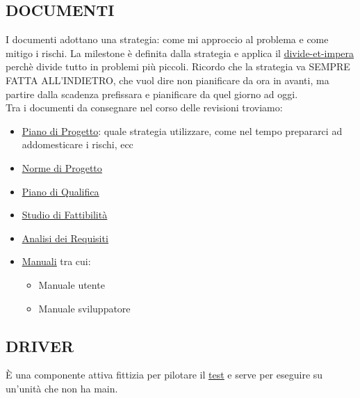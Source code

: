 		\subsection{DOCUMENTI}		\label{documenti}
		I documenti adottano una strategia: come mi approccio al problema e come mitigo i rischi. La milestone è definita dalla strategia e applica il \underline{\hyperref[divideetimpera]{divide-et-impera}} perchè divide tutto in problemi più piccoli. Ricordo che la strategia va SEMPRE FATTA ALL'INDIETRO, che vuol dire non pianificare da ora in avanti, ma partire dalla scadenza prefissara e pianificare da quel giorno ad oggi. \\
		Tra i documenti da consegnare nel corso delle revisioni troviamo:
		\begin{itemize}
			\item \underline{\hyperref[piano]{Piano di Progetto}}: quale strategia utilizzare, come nel tempo prepararci ad addomesticare i rischi, ecc
			\item \underline{\hyperref[norme]{Norme di Progetto}}
			\item \underline{\hyperref[pianoqualifica]{Piano di Qualifica}}
			\item \underline{\hyperref[studiofattibilita]{Studio di Fattibilità}}
			\item \underline{\hyperref[analisideirequisiti]{Analisi dei Requisiti}}
			\item \underline{\hyperref[manuali]{Manuali}} tra cui:
			\begin{itemize}
				\item Manuale utente
				\item Manuale sviluppatore
			\end{itemize}
		\end{itemize}

		\subsection{DRIVER}		\label{driver}
		È una componente attiva fittizia per pilotare il \underline{\hyperref[test]{test}} e serve per eseguire su un'unità che non ha main.
